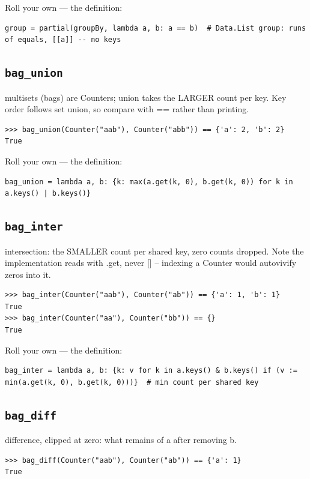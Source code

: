 \documentclass[10pt,letterpaper]{book}
\begin{document}
Roll your own --- the definition:

\begin{lstlisting}[style=ex]
group = partial(groupBy, lambda a, b: a == b)  # Data.List group: runs of equals, [[a]] -- no keys
\end{lstlisting}

\subsection{\texttt{bag\_union}}\label{def:bag-union}
multisets (bags) are Counters; union takes the LARGER count per key. Key order follows set union, so compare with == rather than printing.
\begin{lstlisting}[style=ex]
>>> bag_union(Counter("aab"), Counter("abb")) == {'a': 2, 'b': 2}
True
\end{lstlisting}

Roll your own --- the definition:

\begin{lstlisting}[style=ex]
bag_union = lambda a, b: {k: max(a.get(k, 0), b.get(k, 0)) for k in a.keys() | b.keys()}
\end{lstlisting}
\subsection{\texttt{bag\_inter}}\label{def:bag-inter}
intersection: the SMALLER count per shared key, zero counts dropped. Note the implementation reads with .get, never [] -- indexing a Counter would autovivify zeros into it.
\begin{lstlisting}[style=ex]
>>> bag_inter(Counter("aab"), Counter("ab")) == {'a': 1, 'b': 1}
True
>>> bag_inter(Counter("aa"), Counter("bb")) == {}
True
\end{lstlisting}

Roll your own --- the definition:

\begin{lstlisting}[style=ex]
bag_inter = lambda a, b: {k: v for k in a.keys() & b.keys() if (v := min(a.get(k, 0), b.get(k, 0)))}  # min count per shared key
\end{lstlisting}
\subsection{\texttt{bag\_diff}}\label{def:bag-diff}
difference, clipped at zero: what remains of a after removing b.
\begin{lstlisting}[style=ex]
>>> bag_diff(Counter("aab"), Counter("ab")) == {'a': 1}
True
\end{lstlisting}
\end{document}

